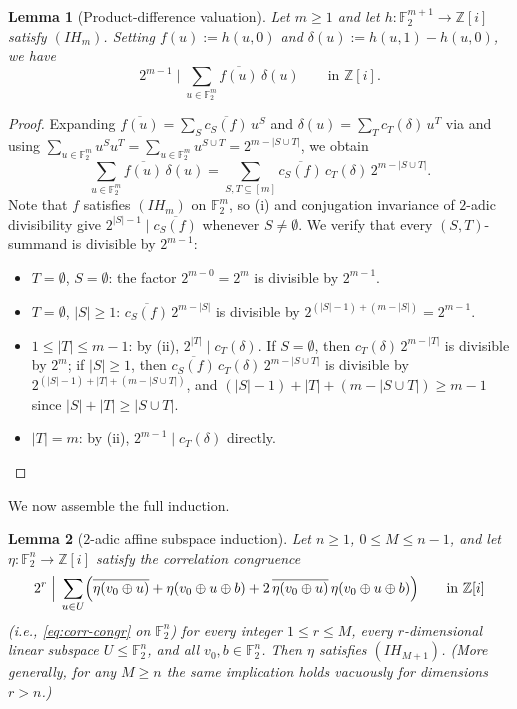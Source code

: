 \documentclass[11pt,a4paper]{article}
\theoremstyle{plain}
\newtheorem{lemma}{Lemma}[section]
\theoremstyle{definition}
\theoremstyle{remark}
\newcommand{\F}{\mathbb{F}}
\newcommand{\Zi}{\mathbb{Z}[i]}
\newcommand{\abs}[1]{\lvert#1\rvert}
\numberwithin{equation}{section}
\begin{document}
\begin{lemma}[Product-difference valuation]\label{lem:prod-diff}
Let $m \ge 1$ and let $h : \F_2^{m+1} \to \Zi$ satisfy $(IH_m)$. Setting $f(u) := h(u, 0)$ and $\delta(u) := h(u, 1) - h(u, 0)$, we have
\[
  2^{m-1} \;\Big|\; \sum_{u \in \F_2^m} \overline{f(u)}\,\delta(u) \qquad \text{in } \Zi.
\]
\end{lemma}

\begin{proof}
Expanding $\overline{f(u)} = \sum_S \overline{c_S(f)}\,u^S$ and $\delta(u) = \sum_T c_T(\delta)\,u^T$ via  and using $\sum_{u \in \F_2^m} u^S u^T = \sum_{u \in \F_2^m} u^{S \cup T} = 2^{m - \abs{S \cup T}}$, we obtain
\[
  \sum_{u \in \F_2^m} \overline{f(u)}\,\delta(u)
  = \sum_{S, T \subseteq [m]} \overline{c_S(f)}\,c_T(\delta)\,2^{m - \abs{S \cup T}}.
\]
Note that $f$ satisfies $(IH_m)$ on $\F_2^m$, so (i) and conjugation invariance of $2$-adic divisibility give $2^{\abs{S}-1} \mid \overline{c_S(f)}$ whenever $S \neq \emptyset$. We verify that every $(S, T)$-summand is divisible by $2^{m-1}$:
\begin{itemize}[leftmargin=1.8em]
  \item $T = \emptyset$, $S = \emptyset$: the factor $2^{m - 0} = 2^m$ is divisible by $2^{m-1}$.
  \item $T = \emptyset$, $\abs{S} \ge 1$: $\overline{c_S(f)}\,2^{m - \abs{S}}$ is divisible by $2^{(\abs{S}-1) + (m - \abs{S})} = 2^{m-1}$.
  \item $1 \le \abs{T} \le m - 1$: by (ii), $2^{\abs{T}} \mid c_T(\delta)$. If $S = \emptyset$, then $c_T(\delta)\,2^{m - \abs{T}}$ is divisible by $2^m$; if $\abs{S} \ge 1$, then $\overline{c_S(f)}\,c_T(\delta)\,2^{m - \abs{S \cup T}}$ is divisible by $2^{(\abs{S}-1) + \abs{T} + (m - \abs{S \cup T})}$, and $(\abs{S}-1) + \abs{T} + (m - \abs{S \cup T}) \ge m - 1$ since $\abs{S} + \abs{T} \ge \abs{S \cup T}$.
  \item $\abs{T} = m$: by (ii), $2^{m-1} \mid c_T(\delta)$ directly. \qedhere
\end{itemize}
\end{proof}

We now assemble the full induction.

\begin{lemma}[$2$-adic affine subspace induction]\label{lem:subspace-induction}
Let $n \ge 1$, $0 \le M \le n - 1$, and let $\eta : \F_2^n \to \Zi$ satisfy the correlation congruence
\[
  2^r \;\Big|\; \sum_{u \in U} \Bigl(\overline{\eta(v_0 \oplus u)} + \eta(v_0 \oplus u \oplus b) + 2\,\overline{\eta(v_0 \oplus u)}\,\eta(v_0 \oplus u \oplus b)\Bigr) \qquad \text{in } \Zi
\]
(i.e., \eqref{eq:corr-congr} on $\F_2^n$) for every integer $1 \le r \le M$, every $r$-dimensional linear subspace $U \le \F_2^n$, and all $v_0, b \in \F_2^n$. Then $\eta$ satisfies $(IH_{M+1})$. (More generally, for any $M \ge n$ the same implication holds vacuously for dimensions $r > n$.)
\end{lemma}
\end{document}
